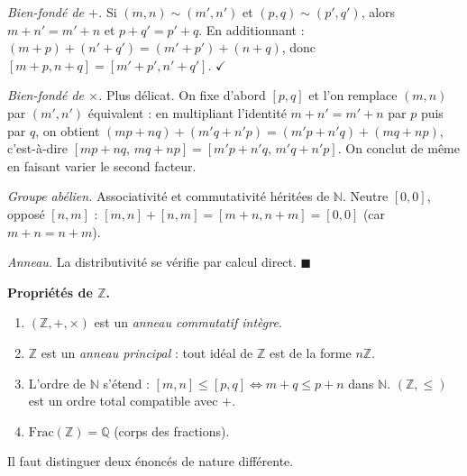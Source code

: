 \begin{mdframed}[style=proofbar]
  \textit{Bien-fondé de $+$.} Si $(m,n)\sim(m',n')$ et $(p,q)\sim(p',q')$,
  alors $m+n'=m'+n$ et $p+q'=p'+q$. En additionnant :
  $(m+p)+(n'+q') = (m'+p')+(n+q)$, donc $[m+p,n+q] = [m'+p',n'+q']$. $\checkmark$

  \textit{Bien-fondé de $\times$.} Plus délicat. On fixe d'abord $[p,q]$ et l'on
  remplace $(m,n)$ par $(m',n')$ équivalent : en multipliant l'identité
  $m+n'=m'+n$ par $p$ puis par $q$, on obtient
  $(mp+nq)+(m'q+n'p) = (m'p+n'q)+(mq+np)$, c'est-à-dire
  $[mp+nq,\,mq+np]=[m'p+n'q,\,m'q+n'p]$.
  On conclut de même en faisant varier le second facteur.

  \textit{Groupe abélien.} Associativité et commutativité héritées de $\mathbb{N}$.
  Neutre $[0,0]$, opposé $[n,m]$ : $[m,n]+[n,m]=[m+n,n+m]=[0,0]$ (car $m+n=n+m$).

  \textit{Anneau.} La distributivité se vérifie par calcul direct. $\blacksquare$
\end{mdframed}

\decsep{}


\begin{tcolorbox}[thmbox]
  \textbf{Propriétés de $\mathbb{Z}$.}\enspace%
  \begin{enumerate}
    \item $(\mathbb{Z}, +, \times)$ est un \emph{anneau commutatif intègre}.
    \item $\mathbb{Z}$ est un \emph{anneau principal} : tout idéal de $\mathbb{Z}$
          est de la forme $n\mathbb{Z}$.
    \item L'ordre de $\mathbb{N}$ s'étend : $[m,n] \leq [p,q]
          \Leftrightarrow m+q \leq p+n$ dans $\mathbb{N}$.
          $(\mathbb{Z}, \leq)$ est un ordre total compatible avec $+$.
    \item $\mathrm{Frac}(\mathbb{Z}) = \mathbb{Q}$ (corps des fractions).
  \end{enumerate}
\end{tcolorbox}


Il faut distinguer deux énoncés de nature différente.

